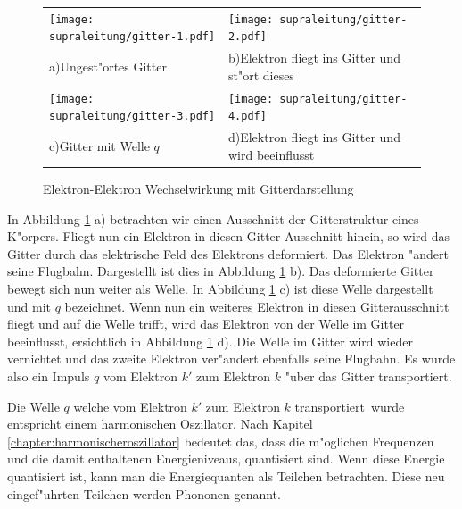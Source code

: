 \begin{refsection}
\begin{figure}
\centering
  \begin{tabular}{l l}
  \centering
    \begin{minipage}{0.48\textwidth}
	\texttt{[image: supraleitung/gitter-1.pdf]}
    \end{minipage}
    &
    \begin{minipage}{0.48\textwidth}
	\texttt{[image: supraleitung/gitter-2.pdf]}	
    \end{minipage}
    \\
    a)\quad Ungest"ortes Gitter
    &
    b)\quad Elektron fliegt ins Gitter und st"ort dieses
    \\
    \begin{minipage}{0.48\textwidth}
	\texttt{[image: supraleitung/gitter-3.pdf]}
    \end{minipage}
    &
    \begin{minipage}{0.48\textwidth}
	\texttt{[image: supraleitung/gitter-4.pdf]}
    \end{minipage}
    \\
    c)\quad Gitter mit Welle $q$
    &
    d)\quad Elektron fliegt ins Gitter und wird beeinflusst
    \\
  \end{tabular}
  \caption{Elektron-Elektron Wechselwirkung mit Gitterdarstellung
  \label{supraleitung:Gitter}}
\end{figure}

In Abbildung \ref{supraleitung:Gitter} a) betrachten wir einen Ausschnitt der Gitterstruktur eines K"orpers.
Fliegt nun ein Elektron in diesen Gitter-Ausschnitt hinein, so wird das Gitter durch das
elektrische Feld des Elektrons deformiert.
Das Elektron "andert seine Flugbahn.
Dargestellt ist dies in Abbildung \ref{supraleitung:Gitter} b).
Das deformierte Gitter bewegt sich nun weiter als Welle.
In Abbildung \ref{supraleitung:Gitter} c) ist diese Welle dargestellt und mit $q$ bezeichnet.
Wenn nun ein weiteres Elektron in diesen Gitterausschnitt fliegt und auf die Welle trifft,
wird das Elektron von der Welle im Gitter beeinflusst, ersichtlich in Abbildung \ref{supraleitung:Gitter} d).
Die Welle im Gitter wird wieder vernichtet und das zweite Elektron ver"andert
ebenfalls seine Flugbahn.
Es wurde also ein Impuls $q$ vom Elektron $k'$ zum Elektron $k$ "uber das Gitter transportiert. 

Die Welle $q$ welche vom Elektron $k'$ zum Elektron $k$ \glqq transportiert\grqq~wurde
entspricht einem harmonischen Oszillator.
Nach Kapitel \ref{chapter:harmonischeroszillator} bedeutet das, dass die m"oglichen Frequenzen
und die damit enthaltenen Energieniveaus, quantisiert sind.
Wenn diese Energie quantisiert ist, kann man die Energiequanten als Teilchen betrachten.
Diese neu eingef"uhrten Teilchen werden Phononen  genannt.


\end{refsection}
